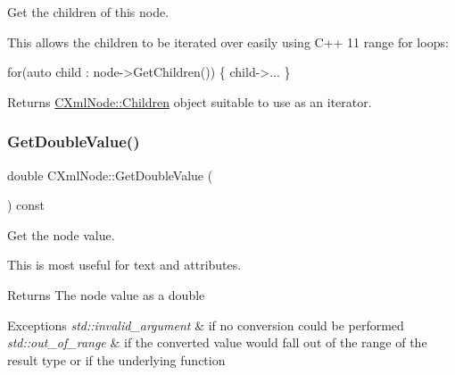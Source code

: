 Get the children of this node. 

This allows the children to be iterated over easily using C++ 11 range for loops\+: 
\begin{DoxyCode}
\textcolor{keywordflow}{for}(\textcolor{keyword}{auto} child : node->GetChildren())
\{
    child->...
\}
\end{DoxyCode}
 \begin{DoxyReturn}{Returns}
\mbox{\hyperlink{classxmlnode_1_1_c_xml_node_1_1_children}{C\+Xml\+Node\+::\+Children}} object suitable to use as an iterator. 
\end{DoxyReturn}
\mbox{\label{classxmlnode_1_1_c_xml_node_a8a2b2726257dc82a35fd2f7810c6ccf7}} 
\subsubsection{\texorpdfstring{Get\+Double\+Value()}{GetDoubleValue()}}
{\footnotesize\ttfamily double C\+Xml\+Node\+::\+Get\+Double\+Value (\begin{DoxyParamCaption}{ }\end{DoxyParamCaption}) const}



Get the node value. 

This is most useful for text and attributes. \begin{DoxyReturn}{Returns}
The node value as a double 
\end{DoxyReturn}

\begin{DoxyExceptions}{Exceptions}
{\em std\+::invalid\+\_\+argument} & if no conversion could be performed \\
\hline
{\em std\+::out\+\_\+of\+\_\+range} & if the converted value would fall out of the range of the result type or if the underlying function \\
\hline
\end{DoxyExceptions}
\mbox{\label{classxmlnode_1_1_c_xml_node_a436c9299f0a8d8ce57d42545cdc4c693}} 
